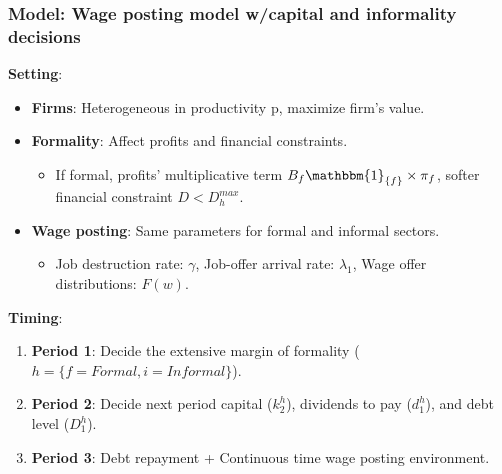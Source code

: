 \documentclass[aspectratio=169]{beamer} %
\begin{document}

\begin{frame}
\frametitle{\textbf{Model}: Wage posting model w/capital and informality decisions}

\textbf{Setting}: 
\vspace{2mm}
\begin{itemize}
    \item \textbf{Firms}: Heterogeneous in productivity p, maximize firm's value.
    \pause
    \vspace{1mm}
    \item \textbf{Formality}: Affect profits and financial constraints. 
    \begin{itemize}
        \item If formal, profits' multiplicative term $B_f \mathbbm{1}_{\{f\}} \times \pi_{f}$, softer financial constraint $D < D^{max}_h$.
    \end{itemize}
    \pause
    \vspace{1mm}
    \item \textbf{Wage posting}: Same parameters for formal and informal sectors.
    \begin{itemize}
        \item Job destruction rate: $\gamma$, Job-offer arrival rate: $\lambda_1$, Wage offer distributions: $F(w)$.
    \end{itemize}
\end{itemize}
\pause
\vspace{3mm}

\textbf{Timing}: 
\vspace{2mm}
\begin{enumerate}
    \item \textbf{Period 1}: Decide the extensive margin of formality ($h = \{f=Formal,i=Informal\}$).
    \pause
    \vspace{1mm}
    \item \textbf{Period 2}: Decide next period capital ($k^h_2$), dividends to pay ($d^h_1$), and debt level ($D^h_1$).
    \pause
    \vspace{1mm}
    \item \textbf{Period 3}: Debt repayment +  Continuous time wage posting environment.
\end{enumerate}

\vspace{3mm}



\end{frame}
\end{document}

